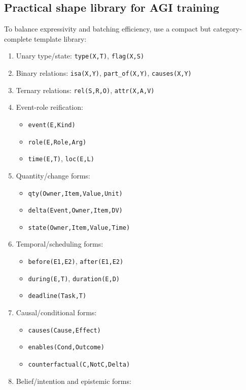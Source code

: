 \documentclass[14pt]{article}
\begin{document}
\subsection{Practical shape library for AGI training}
To balance expressivity and batching efficiency, use a compact but category-complete template library:
\begin{enumerate}[leftmargin=1.5em]
  \item Unary type/state: \texttt{type(X,T)}, \texttt{flag(X,S)}
  \item Binary relations: \texttt{isa(X,Y)}, \texttt{part\_of(X,Y)}, \texttt{causes(X,Y)}
  \item Ternary relations: \texttt{rel(S,R,O)}, \texttt{attr(X,A,V)}
  \item Event-role reification:
  \begin{itemize}
    \item \texttt{event(E,Kind)}
    \item \texttt{role(E,Role,Arg)}
    \item \texttt{time(E,T)}, \texttt{loc(E,L)}
  \end{itemize}
  \item Quantity/change forms:
  \begin{itemize}
    \item \texttt{qty(Owner,Item,Value,Unit)}
    \item \texttt{delta(Event,Owner,Item,DV)}
    \item \texttt{state(Owner,Item,Value,Time)}
  \end{itemize}
  \item Temporal/scheduling forms:
  \begin{itemize}
    \item \texttt{before(E1,E2)}, \texttt{after(E1,E2)}
    \item \texttt{during(E,T)}, \texttt{duration(E,D)}
    \item \texttt{deadline(Task,T)}
  \end{itemize}
  \item Causal/conditional forms:
  \begin{itemize}
    \item \texttt{causes(Cause,Effect)}
    \item \texttt{enables(Cond,Outcome)}
    \item \texttt{counterfactual(C,NotC,Delta)}
  \end{itemize}
  \item Belief/intention and epistemic forms:
  \begin{itemize}

\end{itemize}
\end{enumerate}
\end{document}
